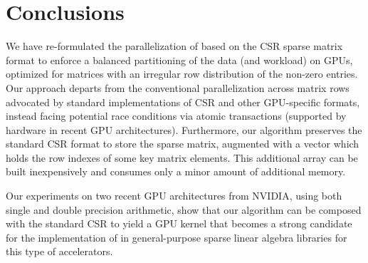 \section{Conclusions}
\label{2017-csr-spmv:sec:conclusion}

We have re-formulated the parallelization of \spmv
based on the CSR sparse matrix format
to enforce a balanced partitioning of the data (and workload) on GPUs,
optimized for matrices with an irregular row distribution
of the non-zero entries.
Our approach departs from the conventional parallelization across matrix rows
advocated by standard implementations of CSR \spmv
and other GPU-specific formats,
instead facing potential race conditions via atomic transactions
(supported by hardware in recent GPU architectures).
Furthermore,
our algorithm preserves the standard CSR format to store the sparse matrix,
augmented with a vector
which holds the row indexes of some key matrix elements. This 
additional array
can be built inexpensively and consumes only a minor amount of additional memory.

Our experiments on two recent GPU architectures from NVIDIA,
using both single and double precision arithmetic,
show that our algorithm can be composed with the standard CSR \spmv
to yield a GPU kernel that becomes a strong candidate
for the implementation of \spmv
in general-purpose sparse linear algebra libraries
for this type of accelerators.

